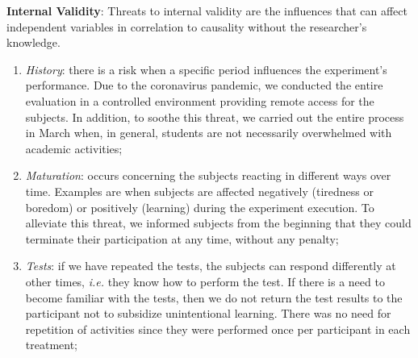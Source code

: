 \textbf{Internal Validity}: 
Threats to internal validity are the influences that can affect independent variables in correlation to causality without the researcher's knowledge.
\begin{enumerate} [label=\roman*.]
    \item \textit{History}: there is a risk when a specific period influences the experiment's performance. Due to the coronavirus pandemic, we conducted the entire evaluation in a controlled environment providing remote access for the subjects. 
    In addition, to soothe this threat, we carried out the entire process in March when, in general, students are not necessarily overwhelmed with academic activities;
    
    \item \textit{Maturation}: occurs concerning the subjects reacting in different ways over time. 
    Examples are when subjects are affected negatively (tiredness or boredom) or positively (learning) during the experiment execution.
    To alleviate this threat, we informed subjects from the beginning that they could terminate their participation at any time, without any penalty;
    
    \item \textit{Tests}: 
    if we have repeated the tests, the subjects can respond differently at other times, \textit{i.e.} they know how to perform the test. 
    If there is a need to become familiar with the tests, then we do not return the test results to the participant not to subsidize unintentional learning.  
    There was no need for repetition of activities since they were performed once per participant in each treatment;
    

\end{enumerate}

